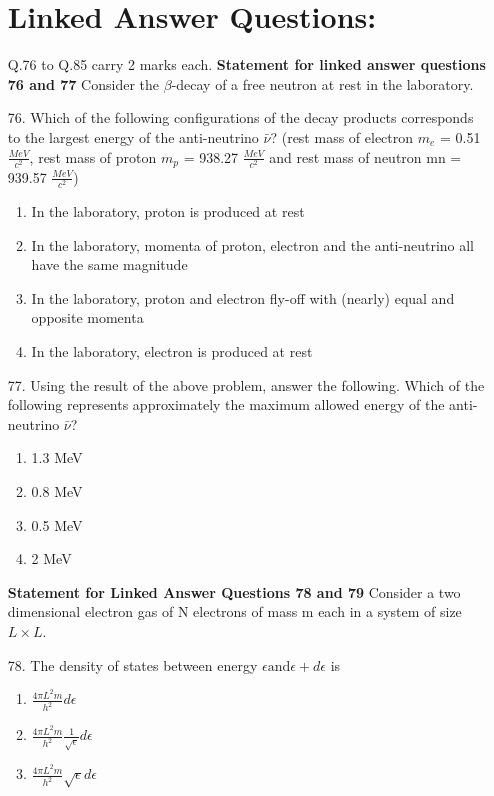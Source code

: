\documentclass[journal]{IEEEtran}
\begin{document}
\begin{enumerate}
    \section{Linked Answer Questions:} Q.76 to Q.85 carry 2 marks each.
    \textbf{Statement for linked answer questions 76 and 77}
    Consider the $\beta$-decay of a free neutron at rest in the laboratory.
    \item[76.] Which of the following configurations of the decay products corresponds to the largest energy of the anti-neutrino $\bar{\nu}$? (rest mass of electron $m_e$ = 0.51 $\frac{MeV}{c^2}$, rest mass of proton $m_p$ = 938.27 $\frac{MeV}{c^2}$ and rest mass of neutron mn = 939.57 $\frac{MeV}{c^2}$)
      \begin{enumerate}[label=(\Alph*)]
        \item In the laboratory, proton is produced at rest
        \item In the laboratory, momenta of proton, electron and the anti-neutrino all have the same magnitude
        \item In the laboratory, proton and electron fly-off with (nearly) equal and opposite momenta
        \item In the laboratory, electron is produced at rest
      \end{enumerate}
    \item[77.] Using the result of the above problem, answer the following. Which of the following represents approximately the maximum allowed energy of the anti-neutrino $\bar{\nu}$?
    \begin{enumerate}[label=(\Alph*)]
        \item 1.3 MeV
        \item 0.8 MeV
        \item 0.5 MeV
        \item 2 MeV
    \end{enumerate}
    \textbf{Statement for Linked Answer Questions 78 and 79 }
    Consider a two dimensional electron gas of N electrons of mass m each in a system of size $L\times L$.
    \item[78.] The density of states between energy $\epsilon \text{and} \epsilon+d\epsilon$ is 
    \begin{enumerate}[label=(\Alph*)]
        \item $\frac{4\pi L^2 m}{h^2}d\epsilon$
        \item  $\frac{4\pi L^2 m}{h^2}\frac{1}{\sqrt{\epsilon}} d\epsilon$
        \item  $\frac{4\pi L^2 m}{h^2}\sqrt{\epsilon}d\epsilon$

\end{enumerate}
\end{enumerate}
\end{document}
